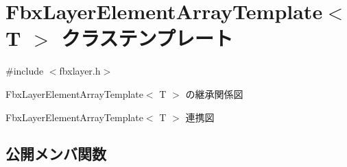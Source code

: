 \hypertarget{class_fbx_layer_element_array_template}{}\section{Fbx\+Layer\+Element\+Array\+Template$<$ T $>$ クラステンプレート}
\label{class_fbx_layer_element_array_template}


{\ttfamily \#include $<$fbxlayer.\+h$>$}



Fbx\+Layer\+Element\+Array\+Template$<$ T $>$ の継承関係図


Fbx\+Layer\+Element\+Array\+Template$<$ T $>$ 連携図
\subsection*{公開メンバ関数}
